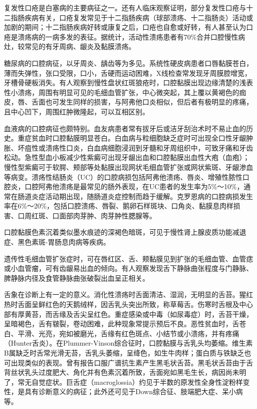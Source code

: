 复发性口疮是白塞病的主要病征之一。还有人临床观察证明，部分复发性口疮与十二指肠疾病有关，口疮复发常见于十二指肠疾病（球部溃疡、十二指肠炎）活动或加剧的期间；十二指肠疾病好转或康复之后，口疮也自愈或好转，有人甚至认为口疮是溃疡病的一病多发的表征。据统计，活动性溃疡患者有70\%合并口腔慢性病灶，较常见的有牙周病、龈炎及黏膜溃疡。

糖尿病的口腔病征，以牙周炎、龋齿等为多见。系统性硬皮病患者口唇黏膜苍白，薄而失弹性，张口受限，口小，舌硬而运动困难，X线检查常发现牙周膜腔增宽，牙槽骨硬板消失。有人观察到慢性盘状红斑狼疮时，口腔黏膜出现边缘清楚的浅表性小溃疡，周围有明显可见的毛细血管扩张，中心微突起，其上覆以黄褐色的痂皮，唇、舌面也可发生同样的损害，与阿弗他口炎相似，但后者有极明显的疼痛，且中心凹下，周围红肿微隆起，可以互相区别。

血液病的口腔病征也颇特别。血友病患者常有拔牙后或洁牙刮治术时不易止血的历史。重症贫血时口腔黏膜明显苍白。白血病与粒细胞缺乏症时可出现全口性牙龈肿胀、坏疽性或溃疡性口炎，白血病细胞浸润到牙髓和牙周组织中，可致牙痛和牙齿松动。急性型血小板减少性紫癜可出现牙龈出血和口腔黏膜出血性大疱（血疱）；慢性型紫癜可于软腭、颊部等处黏膜出现网状毛细血管扩张或网状紫斑、牙龈渗血等病变。溃疡性结肠炎（UC）的口腔病损包括阿弗他溃疡、唇炎、增殖性脓性口腔炎，口腔阿弗他溃疡是最常见的肠外表现，在UC患者的发生率为5\%～10\%，通常在肠道炎症活动期出现，随肠道炎症控制而趋于缓解。克罗恩病的口腔病损发生率在6\%～20\%，包括口腔溃疡、唇裂、鹅卵石样斑块、口角炎、黏膜息肉样损害、口周红斑、口面部肉芽肿、肉芽肿性腮腺等。

口腔黏膜色素沉着类似墨水痕迹的深褐色暗斑，可见于慢性肾上腺皮质功能减退症、黑色素斑-胃肠息肉病等疾病。

遗传性毛细血管扩张症时，可在唇红区、舌、颊黏膜见到扩张的毛细血管、血管痣或小血管瘤，可有齿龈易出血的倾向。有人观察发现舌下静脉曲张程度与门静脉、脾静脉内径及食管静脉曲张破裂出血呈正相关。

舌象在诊断上有一定的意义。消化性溃疡时舌面清洁、湿润，无明显的舌苔。猩红热时舌面呈鲜红色的天鹅绒样，因舌乳头突出所致，称草莓舌。伤寒时舌根及中心部有厚黄苔，而舌缘及舌尖呈红色。重症感染或中毒（如尿毒症）时，舌苔干燥，呈暗褐色，舌有皲裂，卷动困难，此种现象常提示预后不良。恶性贫血时，舌苍白、平滑、光亮，宛如被磨光，舌缘有红色斑点、小结节或小溃疡，并有疼痛（Hunter舌炎）。在Plummer-Vinson综合征时，口腔黏膜与舌乳头均萎缩。维生素B属缺乏时舌常光滑无苔，舌乳头萎缩，呈绛色，如生牛肉样；蛋白质与铁缺乏也可出现类似的表现。曾有报告口服广谱抗生素产生黑毛状舌苔。黑毛状舌苔由于舌背丝状乳头过度肥大、角化并有色素沉着所致，舌面宛如黑毛生长，病因尚未明了，常无自觉症状。巨舌症（macroglossia）约见于半数的原发性全身性淀粉样变性，是具有诊断意义的病征；此外还可见于Down综合征、肢端肥大症、呆小病等。


